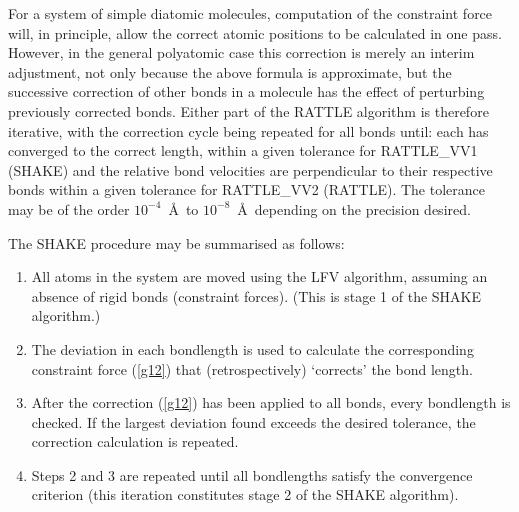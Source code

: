 For a system of simple diatomic molecules, computation of the
constraint force will, in principle, allow the correct atomic
positions to be calculated in one pass.  However, in the general
polyatomic case this correction is merely an interim adjustment, not
only because the above formula is approximate, but the successive
correction of other bonds in a molecule has the effect of perturbing
previously corrected bonds.  Either part of the RATTLE algorithm is
therefore iterative, with the correction cycle being repeated for
all bonds until: each has converged to the correct length, within a
given tolerance for RATTLE\_VV1 (SHAKE) and the relative bond
velocities are perpendicular to their respective bonds within a
given tolerance for RATTLE\_VV2 (RATTLE).  The tolerance may be of
the order $10^{-4}$~\AA~to $10^{-8}$~{\AA}~depending on the
precision desired.

The SHAKE procedure may be summarised as follows:
\begin{enumerate}
\item All atoms in the system are moved using the
LFV algorithm, assuming an absence of
rigid bonds (constraint forces).  (This is
stage 1 of the SHAKE algorithm.)
\item The deviation in each bondlength is used to calculate the
corresponding constraint force (\ref{g12}) that (retrospectively)
`corrects' the bond length.
\item After the correction (\ref{g12}) has been applied to all
bonds, every bondlength is checked.  If the largest deviation found
exceeds the desired tolerance, the correction calculation is
repeated.
\item Steps 2 and 3 are repeated until all bondlengths
satisfy the convergence criterion (this iteration constitutes
stage 2 of the SHAKE algorithm).
\end{enumerate}

